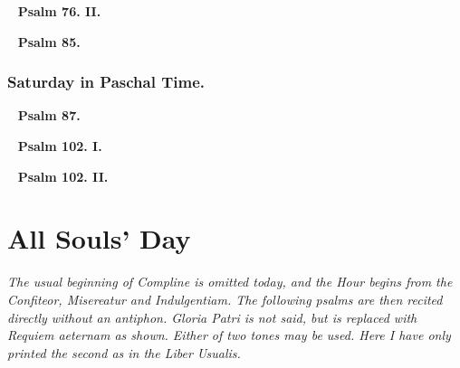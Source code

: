 \documentclass[a5paper,12pt,twoside,openany,oldfontcommands]{memoir}
\newcounter{versecount}
\def\startParallel{}
\def\stopParallel{}
\let\oldtextbf\textbf
\newcommand\rubrics[1]{\textit{#1}}
\newcommand\psalm[1]{~ \hfill \oldtextbf{Psalm #1.} \hfill ~}
\begin{document}
\psalm{76. II}


\setcounter{versecount}{1}
\startParallel

\stopParallel


\psalm{85}


\setcounter{versecount}{1}
\startParallel

\stopParallel




\subsection{Saturday in Paschal Time.}
\label{sat-pt}


\psalm{87}


\setcounter{versecount}{1}
\startParallel

\stopParallel


\psalm{102. I}


\setcounter{versecount}{1}
\startParallel

\stopParallel


\psalm{102. II}


\setcounter{versecount}{1}
\startParallel

\stopParallel



\setcounter{versecount}{0}




\chapter{All Souls' Day}

\rubrics{The usual beginning of Compline is omitted today, and the Hour begins from the \emph{Confiteor}, \emph{Misereatur} and \emph{Indulgentiam}.  The following psalms are then recited directly without an antiphon.  \emph{Gloria Patri} is not said, but is replaced with \emph{Requiem aeternam} as shown.  Either of two tones may be used.  Here I have only printed the second as in the Liber Usualis.}
\end{document}
